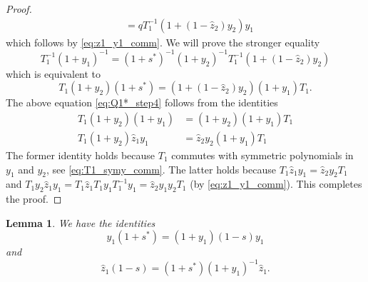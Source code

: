 \documentclass[reqno]{amsart}
\theoremstyle{plain}
\newtheorem{lemma}[theorem]{Lemma}
\theoremstyle{definition}
\theoremstyle{remark}
\newcommand{\z}{\widehat{z}}
\newcommand{\<}{\langle}
\renewcommand{\>}{\rangle}
\begin{document}
\begin{proof}
\begin{align*}
        & = q T_1^{-1}  \left( 1 + (1 - \z_2) y_2 \right) y_1 
    \end{align*}
    which follows by \eqref{eq:z1_y1_comm}.
    We will prove the stronger equality
    \[ T_1^{-1} (1 + y_1)^{-1} =  (1+s^*)^{-1}  (1 + y_2)^{-1} T_1^{-1}  \left( 1 + (1 - \z_2) y_2 \right) \]
    which is equivalent to
    \begin{equation}
        \label{eq:Q1*_step4}
        T_1 (1 + y_2) (1+s^*) = \left( 1 + (1 - \z_2) y_2 \right) (1 + y_1) T_1.
    \end{equation}
    The above equation \eqref{eq:Q1*_step4} follows from the identities
    \begin{align}
        T_1 (1 + y_2) (1 + y_1) &= (1 + y_2) (1 + y_1) T_1 \\
        T_1 (1 + y_2) \z_1 y_1 &= \z_2 y_2 (1 + y_1) T_1
    \end{align}
    The former identity holds because $T_1$ commutes with symmetric polynomials in $y_1$ and $y_2$, see \eqref{eq:T1_symy_comm}.
    The latter holds because $T_1 \z_1 y_1 = \z_2 y_2 T_1$ and $T_1 y_2 \z_1 y_1 = T_1 \z_1 T_1 y_1 T_1^{-1} y_1 = \z_2 y_1 y_2 T_1$ (by \eqref{eq:z1_y1_comm}).
    This completes the proof.
\end{proof}

\begin{lemma}
    \label{lem:theta_q2}
    We have the identities
    \begin{equation}
        \label{eq:y1(1+s*)}
        y_1 (1 + s^*) = (1 + y_1) (1-s) y_1
    \end{equation}
    and
    \begin{equation}
        \label{eq:z1(1-s)}
        \z_1 (1-s) = (1 + s^*) (1 + y_1)^{-1} \z_1.
    \end{equation}
\end{lemma}
\end{document}
